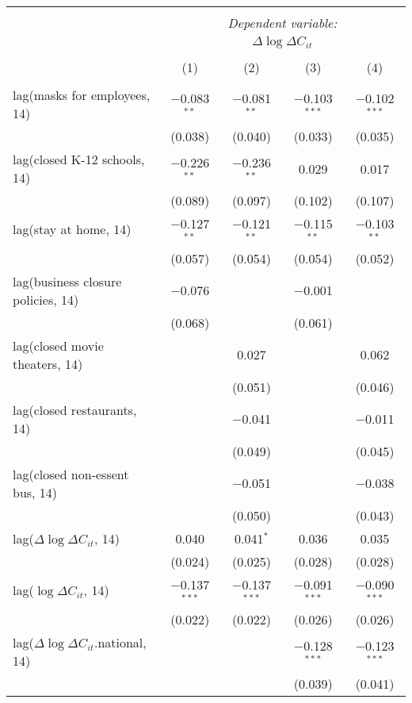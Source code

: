 \begin{tabular}{@{\extracolsep{1pt}}lcccc} 
\\[-1.8ex]\hline 
\hline \\[-1.8ex] 
 & \multicolumn{4}{c}{\textit{Dependent variable:}} \\ 
\cline{2-5} 
 & \multicolumn{4}{c}{$\Delta \log \Delta C_{it}$} \\ 
\\[-1.8ex] & (1) & (2) & (3) & (4)\\ 
\hline \\[-1.8ex] 
 lag(masks for employees, 14) & $-$0.083$^{**}$ & $-$0.081$^{**}$ & $-$0.103$^{***}$ & $-$0.102$^{***}$ \\ 
  & (0.038) & (0.040) & (0.033) & (0.035) \\ 
  lag(closed K-12 schools, 14) & $-$0.226$^{**}$ & $-$0.236$^{**}$ & 0.029 & 0.017 \\ 
  & (0.089) & (0.097) & (0.102) & (0.107) \\ 
  lag(stay at home, 14) & $-$0.127$^{**}$ & $-$0.121$^{**}$ & $-$0.115$^{**}$ & $-$0.103$^{**}$ \\ 
  & (0.057) & (0.054) & (0.054) & (0.052) \\ 
  lag(business closure policies, 14) & $-$0.076 &  & $-$0.001 &  \\ 
  & (0.068) &  & (0.061) &  \\ 
  lag(closed movie theaters, 14) &  & 0.027 &  & 0.062 \\ 
  &  & (0.051) &  & (0.046) \\ 
  lag(closed restaurants, 14) &  & $-$0.041 &  & $-$0.011 \\ 
  &  & (0.049) &  & (0.045) \\ 
  lag(closed non-essent bus, 14) &  & $-$0.051 &  & $-$0.038 \\ 
  &  & (0.050) &  & (0.043) \\ 
  lag($\Delta \log \Delta C_{it}$, 14) & 0.040 & 0.041$^{*}$ & 0.036 & 0.035 \\ 
  & (0.024) & (0.025) & (0.028) & (0.028) \\ 
  lag($\log \Delta C_{it}$, 14) & $-$0.137$^{***}$ & $-$0.137$^{***}$ & $-$0.091$^{***}$ & $-$0.090$^{***}$ \\ 
  & (0.022) & (0.022) & (0.026) & (0.026) \\ 
  lag($\Delta \log \Delta C_{it}$.national, 14) &  &  & $-$0.128$^{***}$ & $-$0.123$^{***}$ \\ 
  &  &  & (0.039) & (0.041) \\ 

\end{tabular}
